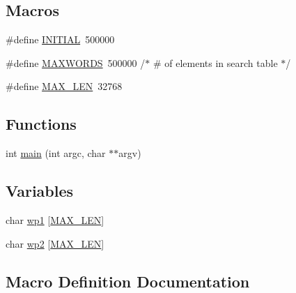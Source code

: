 \subsection*{Macros}
\begin{DoxyCompactItemize}
\item 
\#define \mbox{\hyperlink{adat-devel_2other__libs_2filedb_2filehash_2tcheck_8c_aa3d063564f6ab16f6d408b8369d0e9ff}{I\+N\+I\+T\+I\+AL}}~500000
\item 
\#define \mbox{\hyperlink{adat-devel_2other__libs_2filedb_2filehash_2tcheck_8c_aa6b319146daf33409da1bbe4194553dc}{M\+A\+X\+W\+O\+R\+DS}}~500000	       /$\ast$ \# of elements in search table $\ast$/
\item 
\#define \mbox{\hyperlink{adat-devel_2other__libs_2filedb_2filehash_2tcheck_8c_aabf4f709c8199e41cf279c77112345fe}{M\+A\+X\+\_\+\+L\+EN}}~32768
\end{DoxyCompactItemize}
\subsection*{Functions}
\begin{DoxyCompactItemize}
\item 
int \mbox{\hyperlink{adat-devel_2other__libs_2filedb_2filehash_2tcheck_8c_a3c04138a5bfe5d72780bb7e82a18e627}{main}} (int argc, char $\ast$$\ast$argv)
\end{DoxyCompactItemize}
\subsection*{Variables}
\begin{DoxyCompactItemize}
\item 
char \mbox{\hyperlink{adat-devel_2other__libs_2filedb_2filehash_2tcheck_8c_ae2b9e201e27e242b57e2ff99dff6d28a}{wp1}} \mbox{[}\mbox{\hyperlink{adat__devel_2other__libs_2filedb_2filehash_2twrite_8c_aabf4f709c8199e41cf279c77112345fe}{M\+A\+X\+\_\+\+L\+EN}}\mbox{]}
\item 
char \mbox{\hyperlink{adat-devel_2other__libs_2filedb_2filehash_2tcheck_8c_a54ed4cc0c9df4a27e6b33a32e3c785cc}{wp2}} \mbox{[}\mbox{\hyperlink{adat__devel_2other__libs_2filedb_2filehash_2twrite_8c_aabf4f709c8199e41cf279c77112345fe}{M\+A\+X\+\_\+\+L\+EN}}\mbox{]}
\end{DoxyCompactItemize}


\subsection{Macro Definition Documentation}
\mbox{\label{adat-devel_2other__libs_2filedb_2filehash_2tcheck_8c_aa3d063564f6ab16f6d408b8369d0e9ff}} 
